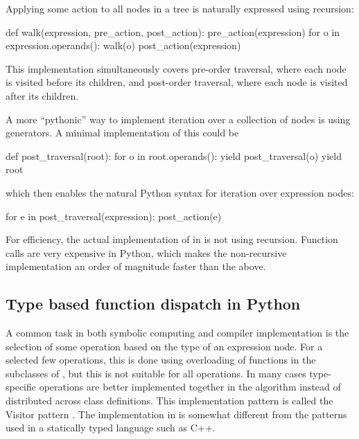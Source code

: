 
Applying some action to all nodes in a tree is naturally expressed
using recursion:
\begin{python}
def walk(expression, pre_action, post_action):
    pre_action(expression)
    for o in expression.operands():
        walk(o)
    post_action(expression)
\end{python}
This implementation simultaneously covers pre-order traversal, where
each node is visited before its children, and post-order traversal,
where each node is visited after its children.

A more ``pythonic'' way to implement iteration over a collection of
nodes is using generators.  A minimal implementation of this could be
\begin{python}
def post_traversal(root):
    for o in root.operands():
        yield post_traversal(o)
    yield root
\end{python}
which then enables the natural Python syntax for iteration over expression
nodes:
\begin{python}
for e in post_traversal(expression):
    post_action(e)
\end{python}
For efficiency, the actual implementation of 
in \ufl{} is not using recursion.  Function calls are very expensive
in Python, which makes the non-recursive implementation an order of
magnitude faster than the above.

\subsection{Type based function dispatch in Python}
\label{ufl:sec:multifunction}

A common task in both symbolic computing and compiler implementation
is the selection of some operation based on the type of an expression
node.  For a selected few operations, this is done using overloading
of functions in the subclasses of , but this is not suitable
for all operations.  In many cases type-specific operations are better
implemented together in the algorithm instead of distributed across
class definitions.  This implementation pattern is called the Visitor
pattern \hbox{\citep{GammaHelmJohnsonEtAl1995}}.  The implementation in \ufl{}
is somewhat different from the patterns used in a statically typed
language such as C++.

